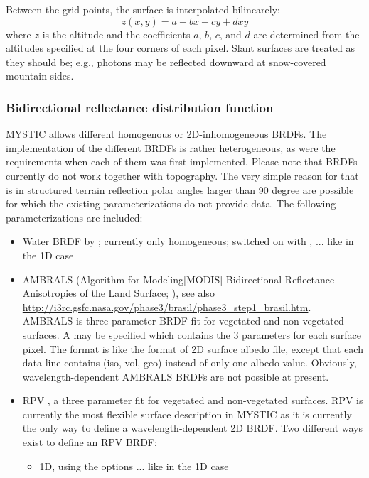 {Between the grid points, the surface is interpolated 
bilinearely: 
\begin{equation}
  z(x,y) = a + bx + cy + dxy
\end{equation}
where $z$ is the altitude and the coefficients $a$, $b$, $c$, and $d$
are determined from 
the altitudes specified at the four corners of each pixel.
Slant surfaces are treated as they should be; e.g., photons
may be reflected downward at snow-covered mountain sides.

\subsubsection{Bidirectional reflectance distribution function}
MYSTIC allows different homogenous or 2D-inhomogeneous BRDFs. The 
implementation of the different BRDFs is rather heterogeneous,   
as were the requirements when each of them was first implemented.
Please note that BRDFs currently do not work together with topography. The 
very simple reason for that is in structured terrain reflection 
polar angles larger than 90 degree are possible for which the 
existing parameterizations do not provide data. The following  
parameterizations are included:
\begin{itemize}
\item Water BRDF by \citet{cox54a,cox54b}; currently only homogeneous; switched 
  on with , ... like in the 1D case
\item AMBRALS (Algorithm for Modeling[MODIS] Bidirectional Reflectance
  Anisotropies of the Land Surface; \citet{wanner97}), see also
  \url{http://i3rc.gsfc.nasa.gov/phase3/brasil/phase3_step1_brasil.htm}.
  AMBRALS is three-parameter BRDF fit for vegetated and non-vegetated surfaces.
  A  may be specified which contains the 
  3 parameters for each surface pixel. The format is like 
  the format of 2D surface albedo file, except that each data line 
  contains (iso, vol, geo) instead of only one albedo value.
  Obviously, wavelength-dependent AMBRALS BRDFs are not 
  possible at present.
\item RPV \citep{rahman93a}, a three parameter 
  fit for vegetated and non-vegetated surfaces. RPV is currently the 
  most flexible surface description in MYSTIC as it is currently 
  the only way to define a wavelength-dependent 2D BRDF. 
  Two different ways exist to define an RPV BRDF:
  \begin{itemize}
  \item 1D, using the options  ... like in the 1D case

\end{itemize}
\end{itemize}}
